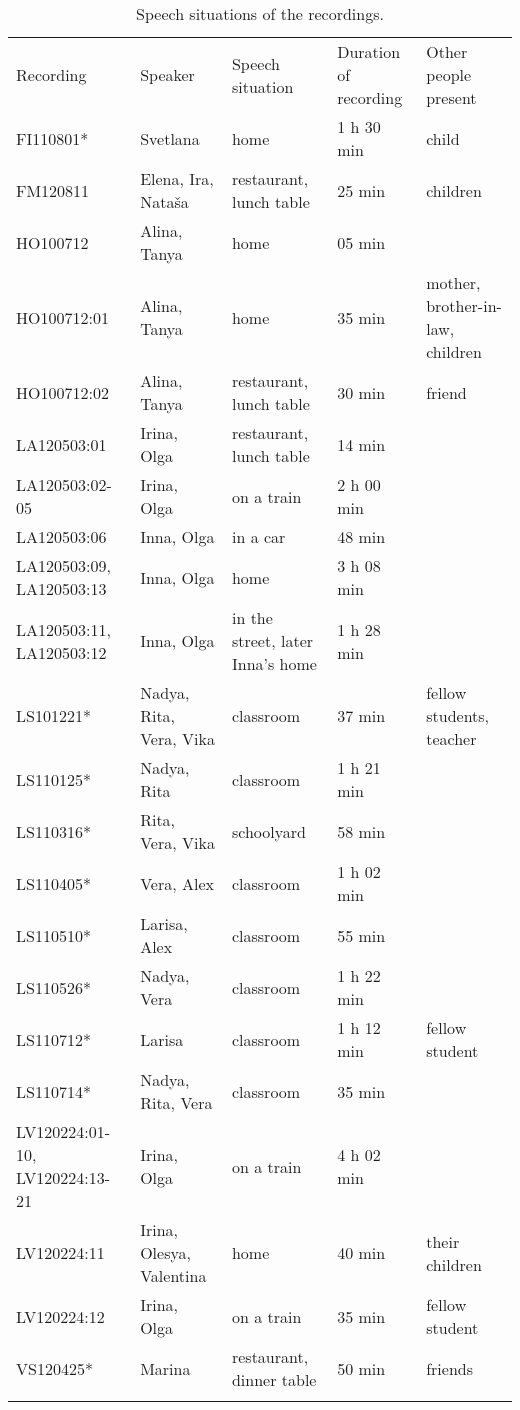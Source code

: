 \begin{table} 
\begin{small}
		\begin{tabular}{p{6.5em}<{\raggedright}p{5.5em}<{\raggedright}p{5.5em}<{\raggedright}p{5.5em}<{\raggedleft}p{6.5em}<{\raggedright}} \midrule
			\addlinespace[2mm]
			Recording	& Speaker	& Speech situation & Duration of recording & Other people present\\ \addlinespace[2mm] \midrule
			\addlinespace[2mm]
	FI110801* & Svetlana	& home & 1 h 30 min & child\\
    FM120811 &Elena, Ira, Nataša & restaurant, lunch table & 25 min &children\\
    HO100712 & Alina, Tanya	& home & 05 min & \\
    HO100712:01	& Alina, Tanya	& home & 35 min & mother, brother-in-law, children\\
    HO100712:02	& Alina, Tanya & restaurant, lunch table & 30 min  & friend\\
    LA120503:01	& Irina, Olga &restaurant, lunch table & 14 min & \\
    LA120503:02-05 &Irina, Olga &on a train & 2 h 00 min & \\
    LA120503:06	&Inna, Olga	&in a car &48 min &\\
    LA120503:09, LA120503:13 &Inna, Olga &home &3 h 08 min\\
    LA120503:11, LA120503:12 &Inna, Olga &in the street, later Inna's home &1 h 28 min &\\
    LS101221* &Nadya, Rita, Vera, Vika & classroom &37 min &fellow students, teacher\\
    LS110125* &Nadya, Rita &classroom &1 h 21 min &\\
    LS110316* &Rita, Vera, Vika &schoolyard &58 min &\\
    LS110405* &Vera, Alex &classroom &1 h 02 min &\\
    LS110510* &Larisa, Alex &classroom &55 min &\\
    LS110526* &Nadya, Vera &classroom &1 h 22 min &\\
    LS110712* &Larisa &classroom &1 h 12 min &fellow student\\
    LS110714* &Nadya, Rita, Vera &classroom &35 min &\\
    LV120224:01-10, LV120224:13-21 &Irina, Olga &on a train &4 h 02 min &\\
    LV120224:11	&Irina, Olesya, Valentina &home &40 min &their children\\
    LV120224:12	&Irina, Olga &on a train &35 min &fellow student\\
    VS120425* &Marina &restaurant, dinner table &50 min &friends\\	\addlinespace[2mm]
		\midrule
	\end{tabular}
\end{small}
	\caption{Speech situations of the recordings.\label{tab:3:5}}
\end{table}

